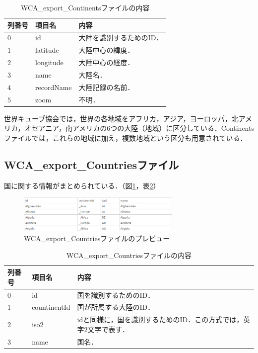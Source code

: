 \documentclass{article}
\begin{document}
  \begin{table}[h]
    \centering
    \caption{WCA\_export\_Continentsファイルの内容}
    \label{table:continents}
    \begin{tabular}{l|l|l}
      \hline
      列番号 & 項目名 & 内容 \\
      \hline \hline
      $ 0 $ & id & 大陸を識別するためのID． \\
      $ 1 $ & latitude & 大陸中心の緯度． \\
      $ 2 $ & longitude & 大陸中心の経度． \\
      $ 3 $ & name & 大陸名． \\
      $ 4 $ & recordName & 大陸記録の名前． \\
      $ 5 $ & zoom & 不明． \\
      \hline
    \end{tabular}
  \end{table}

  世界キューブ協会では，世界の各地域をアフリカ，アジア，ヨーロッパ，北アメリカ，オセアニア，南アメリカの$ 6 $つの大陸（地域）に区分している．Continentsファイルでは，これらの地域に加え，複数地域という区分も用意されている．\par

  \subsection{WCA\_export\_Countriesファイル}

  国に関する情報がまとめられている．（図\ref{figure:countries}，表\ref{table:countries}）\par

  \begin{figure}[h]
    \centering
    \includegraphics[height=18mm]{countries.png}
    \caption{WCA\_export\_Countriesファイルのプレビュー}
    \label{figure:countries}
  \end{figure}

  \begin{table}[h]
    \centering
    \caption{WCA\_export\_Countriesファイルの内容}
    \label{table:countries}
    \begin{tabular}{l|l|l}
      \hline
      列番号 & 項目名 & 内容 \\
      \hline \hline
      $ 0 $ & id & 国を識別するためのID． \\
      $ 1 $ & countinentId & 国が所属する大陸のID． \\
      $ 2 $ & iso2 & idと同様に，国を識別するためのID．この方式では，英字$ 2 $文字で表す． \\
      $ 3 $ & name & 国名． \\
      \hline
    \end{tabular}
  \end{table}
\end{document}
